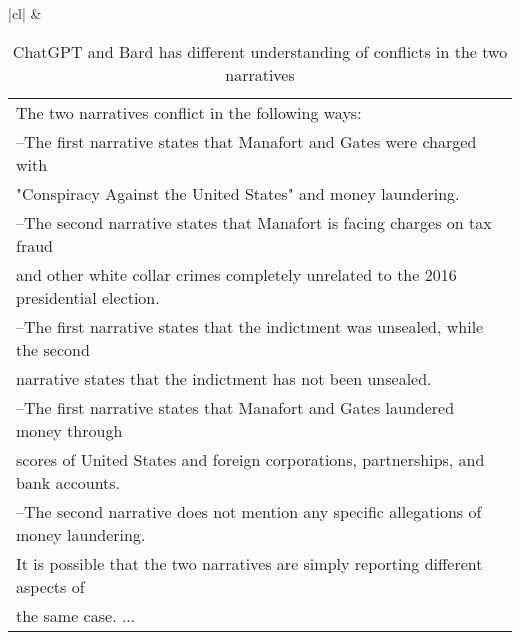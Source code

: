 \begin{table}[]
{\begin{tabular}{|cl|}
 &
  \begin{tabular}[c]{@{}l@{}}The two narratives conflict in the following ways:\\  --The first narrative states that Manafort and Gates were charged with \\      "Conspiracy Against the United States" and money laundering. \\  --The second narrative states that Manafort is facing charges on tax fraud\\      and other white collar crimes completely unrelated to the 2016 presidential election.\\  --The first narrative states that the indictment was unsealed, while the second \\      narrative states that the indictment has not been unsealed.\\  --The first narrative states that Manafort and Gates laundered money through\\    scores of United States and foreign corporations, partnerships, and bank accounts. \\  --The second narrative does not mention any specific allegations of money laundering.\\ It is possible that the two narratives are simply reporting different aspects of\\  the same case. ...\end{tabular} \\ \hline
\end{tabular}%
}
\caption{ChatGPT and Bard has different understanding of conflicts in the two narratives}
\label{table:prompt_example}
\end{table}